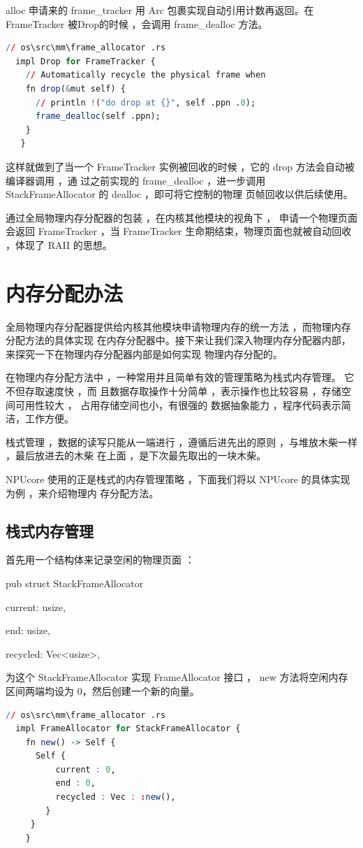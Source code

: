 \documentclass[12pt, a4paper]{ctexart}
\begin{document}
	alloc 申请来的 frame\_tracker 用 Arc 包裹实现自动引用计数再返回。在 FrameTracker 被Drop的时候 ，会调用 frame\_dealloc 方法。
\begin{lstlisting}[language=R]
  // os\src\mm\frame_allocator .rs
  impl Drop for FrameTracker {
    // Automatically recycle the physical frame when
    fn drop(&mut self) {
      // println !("do drop at {}", self .ppn .0);
      frame_dealloc(self .ppn);
    }
   }
\end{lstlisting}

	这样就做到了当一个  FrameTracker 实例被回收的时候 ，它的  drop 方法会自动被编译器调用 ，通 过之前实现的  frame\_dealloc ，进一步调用 StackFrameAllocator 的 dealloc ，即可将它控制的物理 页帧回收以供后续使用。
	
	通过全局物理内存分配器的包装 ，在内核其他模块的视角下 ，  申请一个物理页面会返回 FrameTracker ，当 FrameTracker 生命期结束，物理页面也就被自动回收 ，体现了 RAII 的思想。
	\section{内存分配办法}
	全局物理内存分配器提供给内核其他模块申请物理内存的统一方法 ，而物理内存分配方法的具体实现 在内存分配器中。接下来让我们深入物理内存分配器内部，来探究一下在物理内存分配器内部是如何实现 物理内存分配的。
	
	在物理内存分配方法中 ，一种常用并且简单有效的管理策略为栈式内存管理。  它不但存取速度快 ，而 且数据存取操作十分简单 ，表示操作也比较容易 ，存储空间可用性较大 ，  占用存储空间也小，有很强的 数据抽象能力 ，程序代码表示简洁，工作方便。
	
	栈式管理 ，数据的读写只能从一端进行 ，遵循后进先出的原则 ，与堆放木柴一样 ，最后放进去的木柴 在上面 ，是下次最先取出的一块木柴。
	
	NPUcore 使用的正是栈式的内存管理策略 ，下面我们将以 NPUcore 的具体实现为例 ，来介绍物理内 存分配方法。
	\subsection{栈式内存管理}
	首先用一个结构体来记录空闲的物理页面 ：
	
	pub struct StackFrameAllocator {
		
        current: usize,     
		
        end: usize,         
		
        recycled: Vec<usize>,}
	
	为这个 StackFrameAllocator 实现 FrameAllocator 接口 ，   new 方法将空闲内存区间两端均设为 0，然后创建一个新的向量。
\begin{lstlisting}[language=R]
  // os\src\mm\frame_allocator .rs
  impl FrameAllocator for StackFrameAllocator {
    fn new() -> Self {
	  Self {
		  current : 0,
		  end : 0,
		  recycled : Vec : :new(),
	    }
	 }
    }
\end{lstlisting}
	
\end{document}
